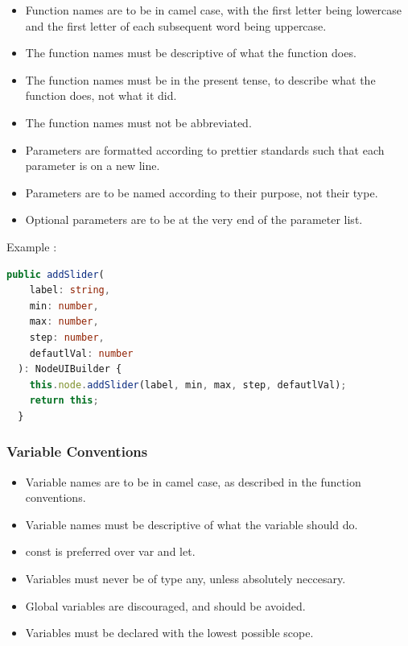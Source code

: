 \documentclass[11pt,a4paper]{article}
\begin{document}
\begin{itemize}
    \item[\textbullet] Function names are to be in camel case, with the first letter being lowercase and the first letter of each subsequent word being uppercase.
    \item[\textbullet] The function names must be descriptive of what the function does.
    \item[\textbullet] The function names must be in the present tense, to describe what the function does, not what it did.
    \item[\textbullet] The function names must not be abbreviated.
    \item[\textbullet] Parameters are formatted according to prettier standards such that each parameter is on a new line.
    \item[\textbullet] Parameters are to be named according to their purpose, not their type.
    \item[\textbullet] Optional parameters are to be at the very end of the parameter list.
\end{itemize}

Example : 

\begin{lstlisting}[language=TypeScript]
  public addSlider(
    label: string,
    min: number,
    max: number,
    step: number,
    defautlVal: number
  ): NodeUIBuilder {
    this.node.addSlider(label, min, max, step, defautlVal);
    return this;
  }

\end{lstlisting}

\subsubsection*{Variable Conventions}

\begin{itemize}
    \item[\textbullet] Variable names are to be in camel case, as described in the function conventions.
    \item[\textbullet] Variable names must be descriptive of what the variable should do.
    \item[\textbullet] const is preferred over var and let.
    \item[\textbullet] Variables must never be of type any, unless absolutely neccesary.
    \item[\textbullet] Global variables are discouraged, and should be avoided.
    \item[\textbullet] Variables must be declared with the lowest possible scope. 
\end{itemize}
\end{document}
